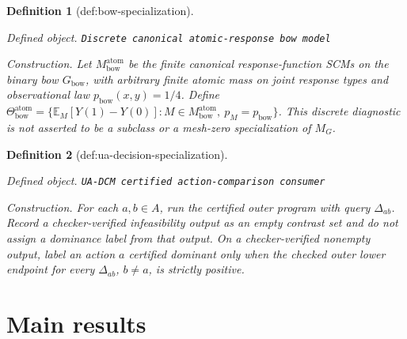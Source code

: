 \documentclass{article}
\newtheorem{definition}{Definition}
\begin{document}
\begin{definition}[def:bow-specialization]\label{def:bow-specialization}
\par\smallskip\noindent\emph{Defined object.} \texttt{Discrete canonical atomic-\allowbreak{}response bow model}
\par\smallskip\noindent\emph{Construction.} Let \(M_{\mathrm{bow}}^{\mathrm{atom}}\) be the finite canonical response-function SCMs on the binary bow \(G_{\mathrm{bow}}\), with arbitrary finite atomic mass on joint response types and observational law \(p_{\mathrm{bow}}(x,y)=1/4\). Define \(\Theta_{\mathrm{bow}}^{\mathrm{atom}}=\{\mathbb E_M[Y(1)-Y(0)]:M\in M_{\mathrm{bow}}^{\mathrm{atom}},\ p_M=p_{\mathrm{bow}}\}\). This discrete diagnostic is not asserted to be a subclass or a mesh-zero specialization of \(M_G\).
\end{definition}

\begin{definition}[def:ua-decision-specialization]\label{def:ua-decision-specialization}
\par\smallskip\noindent\emph{Defined object.} \texttt{UA-\allowbreak{}DCM certified action-\allowbreak{}comparison consumer}
\par\smallskip\noindent\emph{Construction.} For each \(a,b\in A\), run the certified outer program with query \(\Delta_{ab}\).  Record a checker-verified infeasibility output as an empty contrast set and do not assign a dominance label from that output.  On a checker-verified nonempty output, label an action \(a\) certified dominant only when the checked outer lower endpoint for every \(\Delta_{ab}\), \(b\ne a\), is strictly positive.
\end{definition}

\section{Main results}
\end{document}
